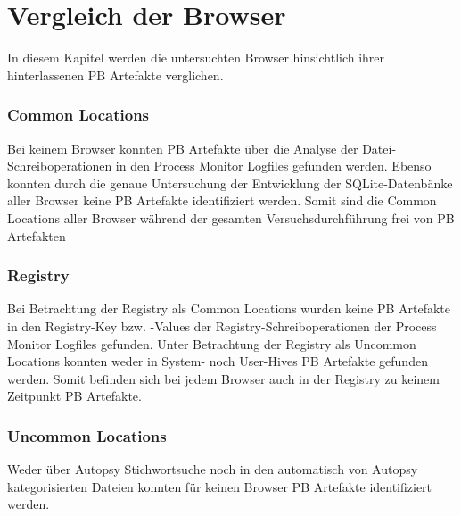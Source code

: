 \chapter{Vergleich der Browser}
\label{chapter:vergleich-der-browser}

In diesem Kapitel werden die untersuchten Browser hinsichtlich ihrer hinterlassenen PB Artefakte verglichen.

\subsection*{Common Locations}
Bei keinem Browser konnten PB Artefakte über die Analyse der Datei-Schreiboperationen in den Process Monitor Logfiles gefunden werden.
Ebenso konnten durch die genaue Untersuchung der Entwicklung der SQLite-Datenbänke aller Browser keine PB Artefakte identifiziert werden.
Somit sind die Common Locations aller Browser während der gesamten Versuchsdurchführung frei von PB Artefakten

\subsection*{Registry}
Bei Betrachtung der Registry als Common Locations wurden keine PB Artefakte in den Registry-Key bzw. -Values der Registry-Schreiboperationen der Process Monitor Logfiles gefunden.
Unter Betrachtung der Registry als Uncommon Locations konnten weder in System- noch User-Hives PB Artefakte gefunden werden.
Somit befinden sich bei jedem Browser auch in der Registry zu keinem Zeitpunkt PB Artefakte.

\subsection*{Uncommon Locations}
Weder über Autopsy Stichwortsuche noch in den automatisch von Autopsy kategorisierten Dateien konnten für keinen Browser PB Artefakte identifiziert werden.

